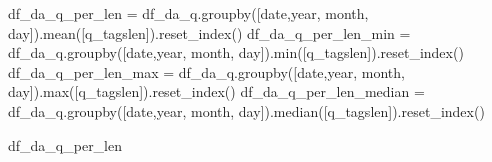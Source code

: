 \documentclass[
  letterpaper,
  DIV=11,
  numbers=noendperiod]{scrartcl}
\newenvironment{Shaded}{\begin{snugshade}}{\end{snugshade}}
\newcommand{\BuiltInTok}[1]{\textcolor[rgb]{0.00,0.23,0.31}{#1}}
\newcommand{\NormalTok}[1]{\textcolor[rgb]{0.00,0.23,0.31}{#1}}
\newcommand{\OperatorTok}[1]{\textcolor[rgb]{0.37,0.37,0.37}{#1}}
\newcommand{\StringTok}[1]{\textcolor[rgb]{0.13,0.47,0.30}{#1}}
\begin{document}
\begin{Shaded}
\begin{Highlighting}[]
\NormalTok{df\_da\_q\_per\_len         }\OperatorTok{=}\NormalTok{ df\_da\_q.groupby([}\StringTok{\textquotesingle{}date\textquotesingle{}}\NormalTok{,}\StringTok{\textquotesingle{}year\textquotesingle{}}\NormalTok{, }\StringTok{\textquotesingle{}month\textquotesingle{}}\NormalTok{, }\StringTok{\textquotesingle{}day\textquotesingle{}}\NormalTok{]).mean([}\StringTok{\textquotesingle{}q\_tagslen\textquotesingle{}}\NormalTok{]).reset\_index()}
\NormalTok{df\_da\_q\_per\_len\_min     }\OperatorTok{=}\NormalTok{ df\_da\_q.groupby([}\StringTok{\textquotesingle{}date\textquotesingle{}}\NormalTok{,}\StringTok{\textquotesingle{}year\textquotesingle{}}\NormalTok{, }\StringTok{\textquotesingle{}month\textquotesingle{}}\NormalTok{, }\StringTok{\textquotesingle{}day\textquotesingle{}}\NormalTok{]).}\BuiltInTok{min}\NormalTok{([}\StringTok{\textquotesingle{}q\_tagslen\textquotesingle{}}\NormalTok{]).reset\_index()}
\NormalTok{df\_da\_q\_per\_len\_max     }\OperatorTok{=}\NormalTok{ df\_da\_q.groupby([}\StringTok{\textquotesingle{}date\textquotesingle{}}\NormalTok{,}\StringTok{\textquotesingle{}year\textquotesingle{}}\NormalTok{, }\StringTok{\textquotesingle{}month\textquotesingle{}}\NormalTok{, }\StringTok{\textquotesingle{}day\textquotesingle{}}\NormalTok{]).}\BuiltInTok{max}\NormalTok{([}\StringTok{\textquotesingle{}q\_tagslen\textquotesingle{}}\NormalTok{]).reset\_index()}
\NormalTok{df\_da\_q\_per\_len\_median  }\OperatorTok{=}\NormalTok{ df\_da\_q.groupby([}\StringTok{\textquotesingle{}date\textquotesingle{}}\NormalTok{,}\StringTok{\textquotesingle{}year\textquotesingle{}}\NormalTok{, }\StringTok{\textquotesingle{}month\textquotesingle{}}\NormalTok{, }\StringTok{\textquotesingle{}day\textquotesingle{}}\NormalTok{]).median([}\StringTok{\textquotesingle{}q\_tagslen\textquotesingle{}}\NormalTok{]).reset\_index()}
\end{Highlighting}
\end{Shaded}

\begin{Shaded}
\begin{Highlighting}[]
\NormalTok{df\_da\_q\_per\_len}
\end{Highlighting}
\end{Shaded}
\end{document}
